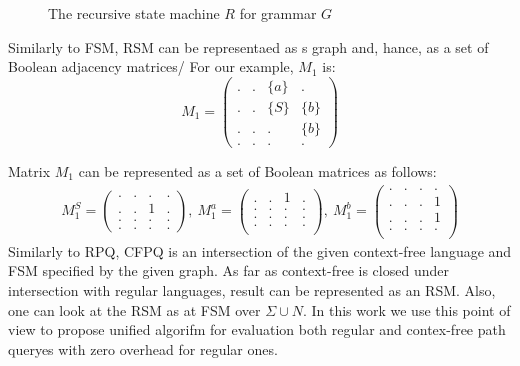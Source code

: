 \begin{figure}[h]
    \centering
    \caption{The recursive state machine $R$ for grammar $G$}
    \label{example:automata}
\end{figure}



Similarly to FSM, RSM can be representaed as s graph and, hance, as a set of Boolean adjacency matrices/
For our example, $M_1$ is:
    $$
    M_1 =
    \begin{pmatrix}
    . & . & \{a\} & .     \\
    . & . & \{S\} & \{b\} \\
    . & . & . & \{b\}     \\
    . & . & . & .
    \end{pmatrix}
    $$

Matrix $M_1$ can be represented as a set of Boolean matrices as follows:
{\small
\begin{align*}
M_1^S =
\begin{pmatrix}      
    . & . & . & .   \\
    . & . & 1 & .   \\
    . & . & . & .   \\
    . & . & . & .   
\end{pmatrix},~M_1^a =
\begin{pmatrix}       
   . & . & 1 & .   \\
   . & . & . & .   \\
   . & . & . & .   \\
   . & . & . & .   \\
\end{pmatrix},~M_1^b =
\begin{pmatrix}      
    . & . & . & .   \\
    . & . & . & 1   \\
    . & . & . & 1   \\
    . & . & . & .   \\
\end{pmatrix}
\end{align*}
}
Similarly to RPQ, CFPQ is an intersection of the given context-free language and FSM specified by the given graph.
As far as context-free is closed under intersection with regular languages, result can be represented as an RSM.
Also, one can look at the RSM as at FSM over $\Sigma \cup N$.
In this work we use this point of view to propose unified algorifm for evaluation both regular and contex-free path queryes with zero overhead for regular ones. 
 

